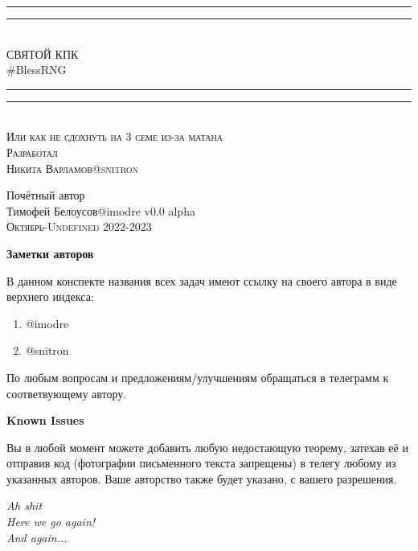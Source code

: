 \documentclass{article}
\begin{document}
\begin{titlepage}
    \centering
    \vspace*{\baselineskip}
    \rule{\textwidth}{1.6pt}\vspace*{-\baselineskip}\vspace*{2pt}
    \rule{\textwidth}{0.4pt}\\[\baselineskip]
    {\LARGE СВЯТОЙ КПК\\ [0.3\baselineskip] \#BlessRNG}\\[0.2\baselineskip]
    \rule{\textwidth}{0.4pt}\vspace*{-\baselineskip}\vspace{3.2pt}
    \rule{\textwidth}{1.6pt}\\[\baselineskip]
    \scshape
    Или как не сдохнуть на 3 семе из-за матана \\
    \vspace*{2\baselineskip}
    Разработал \\[\baselineskip]
    {\Large Никита Варламов\quad @snitron}
        \vspace*{2\baselineskip}\par
    Почётный автор \\[\baselineskip]
    {\Large Тимофей Белоусов\quad @imodre}
    \vfill
    v0.0 alpha\\
    {\scshape Октябрь-Undefined 2022-2023} \par
\end{titlepage}

\textbf{Заметки авторов}

В данном конспекте названия всех задач имеют ссылку на своего автора в виде верхнего индекса:
\begin{enumerate}
    \item @imodre
    \item @snitron
\end{enumerate}
По любым вопросам и предложениям/улучшениям обращаться в телеграмм к соответвующему автору.

\textbf{Known Issues}



Вы в любой момент можете добавить любую недостающую теорему, затехав её и отправив код (фотографии письменного текста запрещены) в телегу любому из указанных авторов. Ваше авторство также будет указано, с вашего разрешения.
\newpage

\begin{flushright}
\emph{Ah shit\\
Here we go again!\\
And again...}
\end{flushright}
\end{document}
